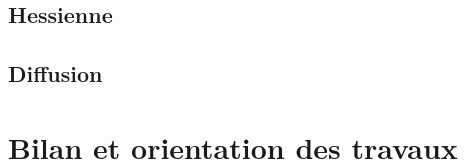 
\subsection{Hessienne}
\label{sec:EA:rehaussement:hessienne}


\subsection{Diffusion}
\label{sec:EA:rehaussement:diffusion}


\section{Bilan et orientation des travaux}
\label{sec:EA:bilan}



